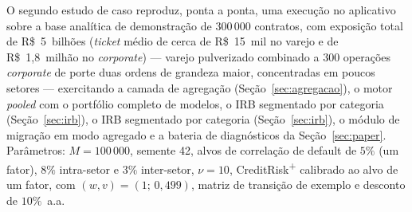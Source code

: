 \documentclass[11pt,a4paper]{article}
\begin{document}
O segundo estudo de caso reproduz, ponta a ponta, uma execução no aplicativo sobre a base analítica de demonstração de $300\,000$ contratos, com exposição total de R\$~5~bilhões (\emph{ticket} médio de cerca de R\$~15~mil no varejo e de R\$~1{,}8~milhão no \emph{corporate}) --- varejo pulverizado combinado a $300$ operações \emph{corporate} de porte duas ordens de grandeza maior, concentradas em poucos setores --- exercitando a camada de agregação (Seção~\ref{sec:agregacao}), o motor \emph{pooled} com o portfólio completo de modelos, o IRB segmentado por categoria (Seção~\ref{sec:irb}), o IRB segmentado por categoria (Seção~\ref{sec:irb}), o módulo de migração em modo agregado e a bateria de diagnósticos da Seção~\ref{sec:paper}. Parâmetros: $M=100\,000$, semente 42, alvos de correlação de default de $5\%$ (um fator), $8\%$ intra-setor e $3\%$ inter-setor, $\nu=10$, CreditRisk\textsuperscript{+} calibrado ao alvo de um fator, com $(w,v)=(1;\,0{,}499)$, matriz de transição de exemplo e desconto de $10\%$~a.a.
\end{document}
